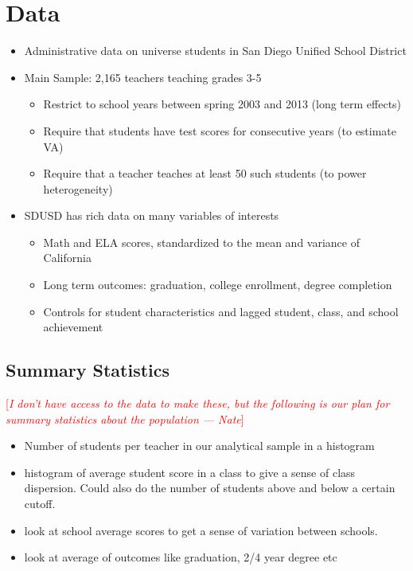 \documentclass[12pt]{article}
\theoremstyle{definition}
\theoremstyle{definition}
\theoremstyle{definition}
\theoremstyle{definition}
\newcommand\cmnt[2]{\;
{\textcolor{red}{[{\em #1 --- #2}] \;}
}}
\newcommand\nate[1]{\cmnt{#1}{Nate}}
\begin{document}
\section{Data}
\label{data_section}
\begin{itemize}
    \item Administrative data on universe students in San Diego Unified School District

    \item Main Sample: 2,165 teachers teaching grades 3-5
        
    \begin{itemize}
        \item Restrict to school years between spring 2003 and 2013 (long term effects)
        \item Require that students have test scores for consecutive years (to estimate VA)
        \item Require that a teacher teaches at least 50 such students (to power heterogeneity)
    \end{itemize}    
        
    \item SDUSD has rich data on many variables of interests
        \begin{itemize}
        \item Math and ELA scores, standardized to the mean and variance of California
        \item Long term outcomes: graduation, college enrollment, degree completion
        \item Controls for student characteristics and lagged student, class, and school achievement
    \end{itemize}
\end{itemize}

    \subsection{Summary Statistics}
    \nate{I don't have access to the data to make these, but the following is our plan for summary statistics about the population}
    \begin{itemize}
        \item Number of students per teacher in our analytical sample in a histogram 
        \item histogram of average student score in a class to give a sense of class dispersion. Could also do the number of students above and below a certain cutoff. 
        \item look at school average scores to get a sense of variation between schools. 
        \item look at average of outcomes like graduation, 2/4 year degree etc
    \end{itemize}
\end{document}
